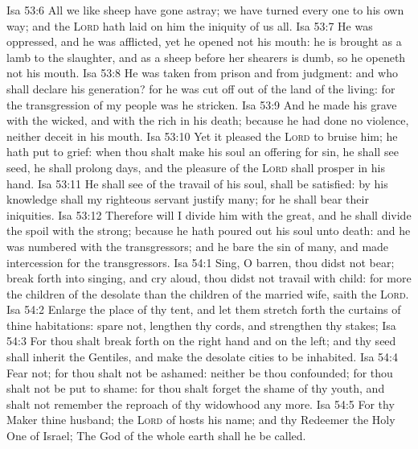 \vs Isa 53:6 All we like sheep have gone astray; we have turned every one to his own way; and the \textsc{Lord} hath laid on him the iniquity of us all.
\vs Isa 53:7 He was oppressed, and he was afflicted, yet he opened not his mouth: he is brought as a lamb to the slaughter, and as a sheep before her shearers is dumb, so he openeth not his mouth.
\vs Isa 53:8 He was taken from prison and from judgment: and who shall declare his generation? for he was cut off out of the land of the living: for the transgression of my people was he stricken.
\vs Isa 53:9 And he made his grave with the wicked, and with the rich in his death; because he had done no violence, neither  deceit in his mouth.
\vs Isa 53:10 Yet it pleased the \textsc{Lord} to bruise him; he hath put  to grief: when thou shalt make his soul an offering for sin, he shall see  seed, he shall prolong  days, and the pleasure of the \textsc{Lord} shall prosper in his hand.
\vs Isa 53:11 He shall see of the travail of his soul,  shall be satisfied: by his knowledge shall my righteous servant justify many; for he shall bear their iniquities.
\vs Isa 53:12 Therefore will I divide him  with the great, and he shall divide the spoil with the strong; because he hath poured out his soul unto death: and he was numbered with the transgressors; and he bare the sin of many, and made intercession for the transgressors.
\vs Isa 54:1 Sing, O barren, thou  didst not bear; break forth into singing, and cry aloud, thou  didst not travail with child: for more  the children of the desolate than the children of the married wife, saith the \textsc{Lord}.
\vs Isa 54:2 Enlarge the place of thy tent, and let them stretch forth the curtains of thine habitations: spare not, lengthen thy cords, and strengthen thy stakes;
\vs Isa 54:3 For thou shalt break forth on the right hand and on the left; and thy seed shall inherit the Gentiles, and make the desolate cities to be inhabited.
\vs Isa 54:4 Fear not; for thou shalt not be ashamed: neither be thou confounded; for thou shalt not be put to shame: for thou shalt forget the shame of thy youth, and shalt not remember the reproach of thy widowhood any more.
\vs Isa 54:5 For thy Maker  thine husband; the \textsc{Lord} of hosts  his name; and thy Redeemer the Holy One of Israel; The God of the whole earth shall he be called.
